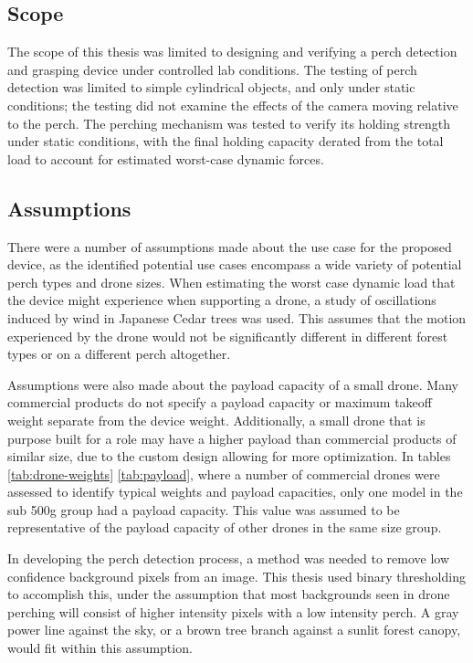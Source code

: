\subsection{Scope}

The scope of this thesis was limited to designing and verifying a perch detection and grasping device under controlled 
lab conditions. The testing of perch detection was limited to simple cylindrical objects, and only under static conditions;
the testing did not examine the effects of the camera moving relative to the perch. The perching mechanism was tested
to verify its holding strength under static conditions, with the final holding capacity derated from the total load
to account for estimated worst-case dynamic forces. 


\subsection{Assumptions}

There were a number of assumptions made about the use case for the proposed device, as the identified potential use 
cases encompass a wide variety of potential perch types and drone sizes. When estimating the worst case dynamic load
that the device might experience when supporting a drone, a study of oscillations induced by wind in Japanese Cedar
trees \cite{kamimura_energy_2024} was used. This assumes that the motion experienced by the drone would not be significantly
different in different forest types or on a different perch altogether.

Assumptions were also made about the payload capacity of a small drone. Many commercial products do not specify a payload
capacity or maximum takeoff weight separate from the device weight. Additionally, a small drone that is purpose built for 
a role may have a higher payload than commercial products of similar size, due to the custom design allowing for more 
optimization. In tables \ref{tab:drone-weights} \ref{tab:payload}, where a number of commercial drones were assessed 
to identify typical weights and payload capacities, only one model in the sub 500g group had a payload capacity. 
This value was assumed to be representative of the payload capacity of other drones in the same size group.

In developing the perch detection process, a method was needed to remove low confidence background pixels from 
an image. This thesis used binary thresholding to accomplish this, under the assumption that most backgrounds 
seen in drone perching will consist of higher intensity pixels with a low intensity perch. A gray 
power line against the sky, or a brown tree branch against a sunlit forest canopy, would fit within this assumption.

